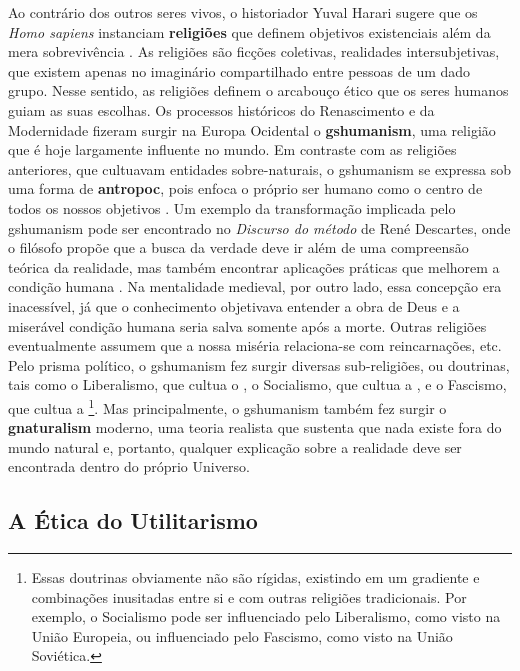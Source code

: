 \documentclass[./main.tex]{subfiles}
\begin{document}
\par Ao contrário dos outros seres vivos, o historiador Yuval Harari sugere que os \textit{Homo sapiens}  instanciam \textbf{religiões} que definem objetivos existenciais além da mera sobrevivência \cite{harari2015sapiens}. As religiões são ficções coletivas, realidades intersubjetivas, que existem apenas no imaginário compartilhado entre pessoas de um dado grupo. Nesse sentido, as religiões definem o arcabouço ético que os seres humanos guiam as suas escolhas. Os processos históricos do Renascimento e da Modernidade fizeram surgir na Europa Ocidental o \textbf{\gls{gshumanism}}, uma religião que é hoje largamente influente no mundo. Em contraste com as religiões anteriores, que cultuavam entidades sobre-naturais, o \gls{gshumanism} se expressa sob uma forma de \textbf{\gls{antropoc}}, pois enfoca o próprio ser humano como o centro de todos os nossos objetivos \cite{lamont1997philosophy}. Um exemplo da transformação implicada pelo \gls{gshumanism} pode ser encontrado no \textit{Discurso do método} de René Descartes, onde o filósofo propõe que a busca da verdade deve ir além de uma compreensão teórica da realidade, mas também encontrar aplicações práticas que melhorem a condição humana \cite{descartes2008discurso}. Na mentalidade medieval, por outro lado, essa concepção era inacessível, já que o conhecimento objetivava entender a obra de Deus e a miserável condição humana seria salva somente após a morte. Outras religiões eventualmente assumem que a nossa miséria relaciona-se com reincarnações, etc. Pelo prisma político, o \gls{gshumanism} fez surgir diversas sub-religiões, ou doutrinas, tais como o Liberalismo, que cultua o , o Socialismo, que cultua a , e o Fascismo, que cultua a \footnote{Essas doutrinas obviamente não são rígidas, existindo em um gradiente e combinações inusitadas entre si e com outras religiões tradicionais. Por exemplo, o Socialismo pode ser influenciado pelo Liberalismo, como visto na União Europeia, ou influenciado pelo Fascismo, como visto na União Soviética.}. Mas principalmente, o \gls{gshumanism} também fez surgir o \textbf{\gls{gnaturalism}} moderno, uma \gls{teoria} realista que sustenta que nada existe fora do mundo natural e, portanto, qualquer explicação sobre a realidade deve ser encontrada dentro do próprio Universo.

\subsection{A Ética do Utilitarismo} \label{subsec:bentham}
\end{document}
